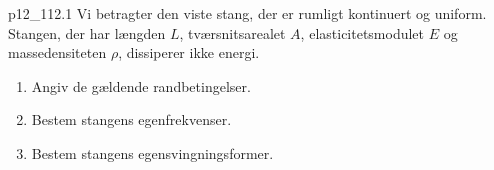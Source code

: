 
\begin{problemwithimage}{p12_1}{12.1}
  Vi betragter den viste stang, der er rumligt kontinuert og uniform.
  Stangen, der har længden $L$, tværsnitsarealet $A$, elasticitetsmodulet $E$ og massedensiteten $\rho$, dissiperer ikke energi.
  \begin{enumerate}[label=\alph*)]
    \item Angiv de gældende randbetingelser.
    \item Bestem stangens egenfrekvenser.
    \item Bestem stangens egensvingningsformer.
  \end{enumerate}
\end{problemwithimage}
